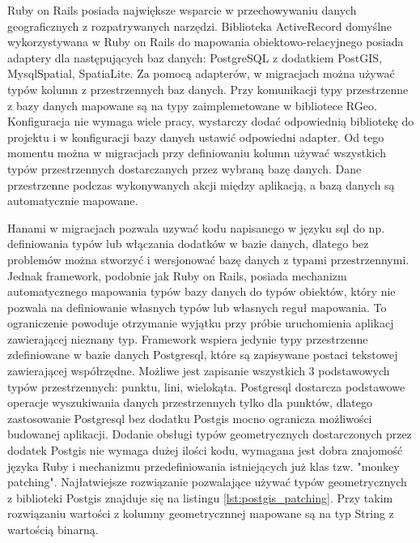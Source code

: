 \documentclass[printmode]{mgr}
\begin{document}
 Ruby on Rails posiada największe wsparcie w przechowywaniu danych geograficznych z rozpatrywanych narzędzi. Biblioteka ActiveRecord domyślne wykorzystywana w Ruby on Rails do mapowania obiektowo-relacyjnego posiada adaptery dla następujących baz danych: PostgreSQL z dodatkiem PostGIS, MysqlSpatial, SpatiaLite. Za pomocą adapterów, w migracjach można używać typów kolumn z przestrzennych baz danych. Przy komunikacji typy przestrzenne z bazy danych mapowane są na typy zaimplemetowane w bibliotece RGeo. Konfiguracja nie wymaga wiele pracy, wystarczy dodać odpowiednią bibliotekę do projektu i w konfiguracji bazy danych ustawić odpowiedni adapter. Od tego momentu można w migracjach przy definiowaniu kolumn używać wszystkich typów przestrzennych dostarczanych przez wybraną bazę danych. Dane przestrzenne podczas wykonywanych akcji między aplikacją, a bazą danych są automatycznie mapowane.

 Hanami w migracjach pozwala uzywać kodu napisanego w języku sql do np. definiowania typów lub włączania dodatków w bazie danych, dlatego bez problemów można stworzyć i wersjonować bazę danych z typami przestrzennymi. Jednak framework, podobnie jak Ruby on Rails, posiada mechanizm automatycznego mapowania typów bazy danych do typów obiektów, który nie pozwala na definiowanie własnych typów lub własnych reguł mapowania. To ograniczenie powoduje otrzymanie wyjątku przy próbie uruchomienia aplikacj zawierającej nieznany typ. Framework wspiera jedynie typy przestrzenne zdefiniowane w bazie danych Postgresql, które są zapisywane postaci tekstowej zawierającej współrzędne. Możliwe jest zapisanie wszystkich 3 podstawowych typów przestrzennych: punktu, lini, wielokąta. Postgresql dostarcza podstawowe operacje wyszukiwania danych przestrzennych tylko dla punktów, dlatego zastosowanie Postgresql bez dodatku Postgis mocno ogranicza możliwości budowanej aplikacji. Dodanie obsługi typów geometrycznych dostarczonych przez dodatek Postgis nie wymaga dużej ilości kodu, wymagana jest dobra znajomość języka Ruby i mechanizmu przedefiniowania istniejących już klas tzw. "monkey patching". Najłatwiejsze rozwiązanie pozwalające używać typów geometrycznych z biblioteki Postgis znajduje się na listingu \ref{lst:postgis_patching}. Przy takim rozwiązaniu wartości z kolumny geometrycznnej mapowane są na typ String z wartością binarną.

 \newpage
\end{document}
